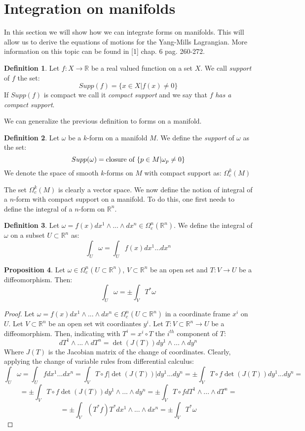 \documentclass[12pt,a4paper]{report}
\theoremstyle{definition}
\newtheorem{Def}{Definition}[chapter]
\theoremstyle{Theorem}
\newtheorem{Prop}[Def]{Proposition}
\theoremstyle{definition}
\theoremstyle{definition}
\begin{document}
	\section{{Integration on manifolds}}
	In this section we will show how we can integrate forms on manifolds. This will allow us to derive the equations of motions for the Yang-Mills Lagrangian. More information on this topic can be found in [1] chap. 6 pag. 260-272.
	\begin{Def}
		Let $f:X\rightarrow \mathbb{R}$ be a real valued function on a set $X$. We call \textit{support} of $f$ the set:
		$$Supp(f)=\{x\in X|f(x)\neq 0\}$$
		If $Supp(f)$ is compact we call it \textit{compact support} and we say that $f$ \textit{has a compact support}.
	\end{Def}
	We can generalize the previous definition to forms on a manifold.
	\begin{Def}
		Let $\omega$ be a $k$-form on a manifold $M$. We define the \textit{support} of $\omega$ as the set:
		$$Supp(\omega)=\hbox{closure of }\{p\in M|\omega_p\neq 0\}$$
		We denote the space of smooth $k$-forms on $M$ with compact support as: $\Omega_c^k(M)$
	\end{Def}
	The set $\Omega^k_c(M)$ is clearly a vector space.
	We now define the notion of integral of a $n$-form with compact support on a manifold. To do this, one first needs to define the integral of a $n$-form on $\mathbb{R}^n$.
	\begin{Def}
		Let $\omega=f(x)dx^1\wedge...\wedge dx^n\in\Omega^n_c(\mathbb{R}^n)$. We define the integral of $\omega$ on a subset $U\subset\mathbb{R}^n$ as:
		$$\int_U\omega=\int_Uf(x)dx^1...dx^n$$ 
	\end{Def}
	\begin{Prop}
		Let $\omega\in\Omega^n_c(U\subset \mathbb{R}^n)$, $V\subset \mathbb{R}^n$ be an open set and $T:V\rightarrow U$ be a diffeomorphism. Then:
		$$\int_U\omega=\pm\int_VT^*\omega$$
	\end{Prop}
	\begin{proof}
		Let $\omega=f(x)dx^1\wedge...\wedge dx^n\in\Omega^n_c(U\subset \mathbb{R}^n)$ in a coordinate frame $x^i$ on $U$. Let $V\subset \mathbb{R}^n$ be an open set wit coordiantes $y^i$. Let $T:V\subset \mathbb{R}^n\rightarrow U$ be a diffeomorphism. Then, indicating with $T^i=x^i\circ T$ the $i^{th}$ component of $T$:
		$$dT^1\wedge...\wedge dT^n=\det( J(T))dy^1\wedge...\wedge dy^n$$
		Where $J(T)$ is the Jacobian matrix of the change of coordinates. Clearly, applying the change of variable rules from differential calculus:
		$$\int_U\omega=\int_Uf dx^1...dx^n=\int_V T\circ f |\det(J(T))|dy^1...dy^n=\pm\int_V T\circ f \det(J(T))dy^1...dy^n=$$
		$$=\pm\int_V T\circ f \det(J(T))dy^1\wedge...\wedge dy^n=\pm\int_V T\circ f dT^1\wedge...\wedge dT^n=$$
		$$=\pm\int_V(T^*f)T^*dx^1\wedge...\wedge dx^n=\pm\int_V T^*\omega$$
	\end{proof}
\end{document}
